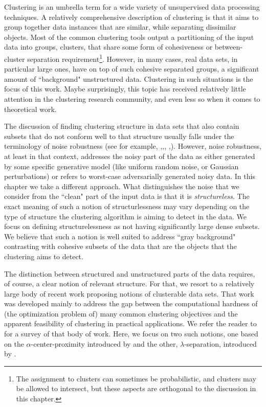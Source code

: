 \documentclass[12pt]{article}
\begin{document}
\fi

Clustering is an umbrella term for a wide variety of unsupervised data processing techniques. A relatively comprehensive description of clustering is  that it aims to group together data instances that are similar, while separating dissimilar objects. Most of the common clustering tools output a partitioning of the input data into groups, clusters, that share some form of cohesiveness or between-cluster separation requirement\footnote{The assignment to clusters can sometimes be probabilistic, and clusters may be allowed to intersect, but these aspects are orthogonal to the discussion in this chapter.}. However, in many cases, real data sets, in particular large ones, have on top of such cohesive separated groups, a significant amount of ``background" unstructured data. Clustering in such situations is the focus of this work. Maybe surprisingly, this topic has received relatively little attention in the clustering research community, and even less so when it comes to theoretical work. 

The discussion of finding clustering structure in data sets that also contain subsets that do not conform well to that structure usually falls under the terminology of noise robustness (see for example, \cite{balcan2012clustering},\cite{ackerman2009clusterability},\cite{dave1993robust}, \cite{cuesta1997trimmed},\cite{garcia2008general}). However, noise robustness, at least in that context, addresses the noisy part of the data as either generated by some specific generative model (like uniform random noise, or Gaussian perturbations) or refers to worst-case adversarially generated noisy data. In this chapter we take a different approach. What distinguishes the noise that we consider from the ``clean" part of the input data is that it is \emph{structureless}. The exact meaning of such a notion of structurlessness may vary depending on the type of structure the clustering algorithm is aiming to detect in the data. We focus on defining structurelessness as  not having significantly large dense subsets. We believe that such a notion is well suited to address ``gray background" contrasting with cohesive subsets of the data that are the objects that the clustering aims to detect. 

The distinction between structured and unstructured parts of the data requires, of course, a clear notion of relevant structure. For that, we resort to a relatively large body of recent work proposing notions of clusterable data sets. That work was developed mainly to address the gap between the computational hardness of (the optimization problem of) many common clustering objectives and the apparent feasibility of clustering in practical applications. We refer the reader to \cite{ben2015computational} for a survey of that body of work. Here, we focus on two such notions, one based on the $\alpha$-center-proximity introduced by \cite{awasthi2012center} and the other, $\lambda$-separation, introduced by \cite{ben2014clustering}.
\end{document}
